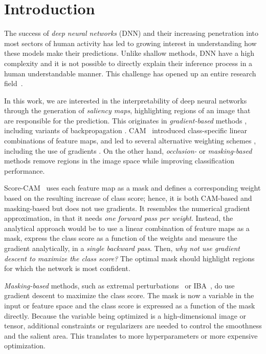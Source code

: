 \section{Introduction}
\label{sec:intro}

The success of \emph{deep neural networks} (DNN) and their increasing penetration into most sectors of human activity has led to growing interest in understanding how these models make their predictions. Unlike shallow methods, DNN have a high complexity and it is not possible to directly explain their inference process in a human understandable manner. This challenge has opened up an entire research field~\citep{guidotti2018survey, montavon2018methods, samek2021explaining, bodria2021benchmarking, li2021interpretable}.

In this work, we are interested in the interpretability of deep neural networks through the generation of \emph{saliency maps}, highlighting regions of an image that are responsible for the prediction. This originates in \emph{gradient-based} methods \citep{simonyan2013deep, yosinski2015understanding}, including variants of backpropagation \citep{zeiler2014visualizing, springenberg2014striving, bach2015pixel}. CAM~\citep{zhou2016learning} introduced class-specific linear combinations of feature maps, and led to several alternative weighting schemes \citep{ramaswamy2020ablation, wang2020score, muhammad2020eigen}, including the use of gradients \citep{selvaraju2017grad, chattopadhay2018grad}. On the other hand, \emph{occlusion-} or \emph{masking-based} methods \citep{dabkowski2017real, fong2017interpretable, fong2019understanding, schulz2020restricting} remove regions in the image space while improving classification performance.

Score-CAM~\cite{wang2020score} uses each feature map as a mask and defines a corresponding weight based on the resulting increase of class score; hence, it is both CAM-based and masking-based but does not use gradients. It resembles the numerical gradient approximation, in that it needs \emph{one forward pass per weight}. Instead, the analytical approach would be to use a linear combination of feature maps as a mask, express the class score as a function of the weights and measure the gradient analytically, in a \emph{single backward pass}. Then, \emph{why not use gradient descent to maximize the class score?} The optimal mask should highlight regions for which the network is most confident.

\emph{Masking-based} methods, such as extremal perturbations~\citep{fong2019understanding} or IBA~\citep{schulz2020restricting}, do use gradient descent to maximize the class score. The mask is now a variable in the input or feature space and the class score is expressed as a function of the mask directly. Because the variable being optimized is a high-dimensional image or tensor, additional constraints or regularizers are needed to control \eg the smoothness and the salient area. This translates to more hyperparameters or more expensive optimization.

